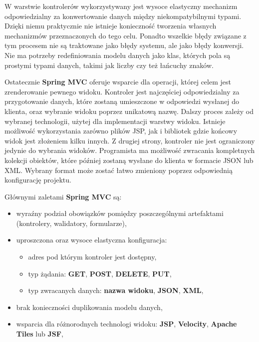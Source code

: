 		W warstwie kontrolerów wykorzystywany jest wysoce elastyczny mechanizm odpowiedzialny za konwertowanie danych między niekompatybilnymi typami. Dzięki niemu praktycznie nie istnieje konieczność tworzenia własnych mechanizmów przeznaczonych do tego celu. Ponadto wszelkie błędy związane z tym procesem nie są traktowane jako błędy systemu, ale jako błędy konwersji. Nie ma potrzeby redefiniowania modelu danych jako klas, których pola są prostymi typami danych, takimi jak liczby czy też łańcuchy znaków.
		
		Ostatecznie \textbf{Spring MVC} oferuje wsparcie dla operacji, której celem jest zrenderowanie pewnego widoku. Kontroler jest najczęściej odpowiedzialny za przygotowanie danych, które zostaną umieszczone w odpowiedzi wysłanej do klienta, oraz wybranie widoku poprzez unikatową nazwę. Dalszy proces zależy od wybranej technologii, użytej dla implementacji warstwy widoku. Istnieje możliwość wykorzystania zarówno plików JSP, jak i bibliotek gdzie końcowy widok jest złożeniem kilku innych. Z drugiej strony, kontroler nie jest ograniczony jedynie do wybrania widoków. Programista ma możliwość zwracania kompletnych kolekcji obiektów, które później zostaną wysłane do klienta w formacie JSON lub XML. Wybrany format może zostać łatwo zmieniony poprzez odpowiednią konfigurację projektu. 
		
		Głównymi zaletami \textbf{Spring MVC} są:
		\begin{itemize}
			\item wyraźny podział obowiązków pomiędzy poszczególnymi artefaktami (kontrolery, walidatory, formularze),
			\item uproszczona oraz wysoce elastyczna konfiguracja:
			\begin{itemize}
				\item adres pod którym kontroler jest dostępny,
				\item typ żądania: \textbf{GET}, \textbf{POST}, \textbf{DELETE}, \textbf{PUT},
				\item typ zwracanych danych: \textbf{nazwa widoku}, \textbf{JSON}, \textbf{XML},
			\end{itemize}
			\item brak konieczności duplikowania modelu danych,
			\item wsparcia dla różnorodnych technologi widoku: \textbf{JSP}, \textbf{Velocity}, \textbf{Apache Tiles} lub \textbf{JSF},
		\end{itemize}
		
